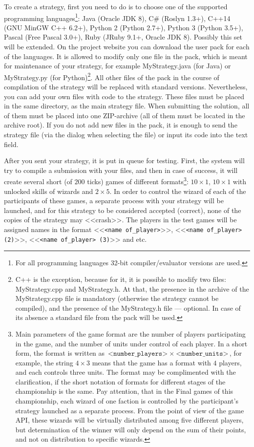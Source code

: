 To create a strategy, first you need to do is to choose one of the supported programming languages\footnote[14]{For all programming languages
32-bit compiler/evaluator versions are used.}: Java (Oracle JDK 8), C\# (Roslyn 1.3+), C++14 (GNU MinGW C++
6.2+), Python 2 (Python 2.7+), Python 3 (Python 3.5+), Pascal (Free Pascal 3.0+), Ruby (JRuby 9.1+, Oracle JDK 8). Possibly this set
will be extended. On the project website you can download the user pack for each of the languages. It is allowed to modify only one
file in the pack, which is meant for maintenance of your strategy, for example MyStrategy.java (for Java) or MyStrategy.py (for
Python)\footnote[15]{C++ is the exception, because for it, it is possible to modify two files: MyStrategy.cpp and MyStrategy.h. At that, the presence
in the archive of the MyStrategy.cpp file is mandatory (otherwise the strategy cannot be compiled), and the presence of the MyStrategy.h file --- optional. In case
of its absence a standard file from the pack will be used.}. All other files of the pack in the course of compilation of the strategy will be replaced
with standard versions. Nevertheless, you can add your own files with code to the strategy. These files must be placed in the same directory, as the
main strategy file. When submitting the solution, all of them must be placed into one ZIP-archive (all of them must be located in the archive root). If
you do not add new files in the pack, it is enough to send the strategy file (via the dialog when selecting the file) or input its code into
the text field.
 
After you sent your strategy, it is put in queue for testing. First, the system will try to compile a submission with your
files, and then in case of success, it will create several short (of $200$ ticks) games of different formats\footnote[16]{Main
parameters of the game format are the number of players participating in the game, and the number of units under control of each player.
In a short form, the format is written as $\texttt{<number\_players>}~\times~\texttt{<number\_units>}$, for example, the string $4\times3$ means
that the game has a format with $4$ players, and each controls three units. The format may be complimented with the clarification, if
the short notation of formats for different stages of the championship is the same. Pay attention, that in the Final games of this championship, each wizard of
one faction is controlled by the participant's strategy launched as a separate process. From the point of view of the game API, these wizards
will be virtually distributed among five different players, but determination of the winner will only depend on the sum of their points, and not on
distribution to specific wizards.}: $10\times1$, $10\times1$ with unlocked skills of wizards and $2\times5$. In order to control
the wizard of each of the participants of these games, a separate process with your strategy will be launched, and for this strategy
to be considered accepted (correct), none of the copies of the strategy may <<crash>>. The players in the test games will be assigned names in the
format <<\texttt{<name of\_player>}>>, <<\texttt{<name of\_player> (2)}>>, <<\texttt{<name of\_player> (3)}>> and etc.
 
